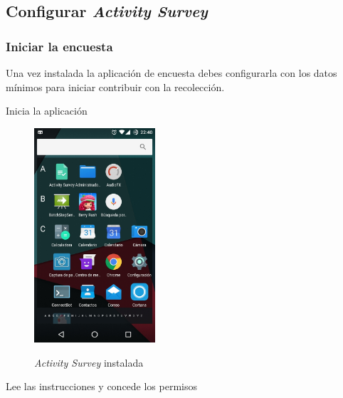 {\subsection{Configurar \emph{Activity Survey}}
\label{config:configurar-activity-survey}\label{config:har-config}\label{config::doc}

\subsubsection{Iniciar la encuesta}
\label{config:iniciar-la-encuesta}
Una vez instalada la aplicación de encuesta debes configurarla con los datos mínimos para iniciar
contribuir con la recolección.

Inicia la aplicación
\begin{figure}[h]
\centering
    {\includegraphics[width=0.4\textwidth]{anexos/graphics/app_inst.jpg}}
\caption{\emph{Activity Survey} instalada}\label{config:id1}\end{figure}

Lee las instrucciones y concede los permisos

}
